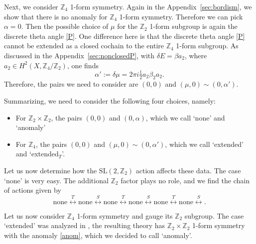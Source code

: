 \documentclass[12pt]{article}
\numberwithin{equation}{section}
\def\bZ{\mathbb{Z}}
\def\SL{\mathrm{SL}}
\begin{document}
Next, we consider $\bZ_4$ 1-form symmetry.
Again in the Appendix~\ref{sec:bordism}, we show that there is no anomaly for $\bZ_4$ 1-form symmetry.
Therefore we can pick $\alpha=0$. Then the possible choice of $\mu$ for the $\bZ_2$ 1-form subgroup is again the discrete theta angle \eqref{P}.
One difference here is that the discrete theta angle \eqref{P} cannot be extended as a closed cochain to the entire $\bZ_4$ 1-form subgroup.
As discussed in the Appendix~\ref{sec:nonclosedP}, with $\delta E=\beta a_2$,
where $a_2\in H^2(X,\bZ_4/\bZ_2)$,
one finds \begin{equation}
\alpha':=\delta \mu = 2\pi i \tfrac12 a_2 \beta_2 a_2.\label{anom'}
\end{equation}
Therefore, the pairs we need to consider are $(0,0)$ and $(\mu,0)\sim (0,\alpha')$. 

\def\Textended{extended$_T$}
Summarizing,  we need to consider the following four choices, namely:
\begin{itemize}
\item For $\bZ_2\times \bZ_2$, the pairs $(0,0)$ and $(0,\alpha)$, which we call `none' and `anomaly'
\item For $\bZ_4$, the pairs $(0,0)$ and $(\mu,0)\sim (0,\alpha')$, which we call `extended' and `\Textended'.
\end{itemize}


Let us now determine how the $\SL(2,\bZ_2)$ action affects these data.
The case `none' is very easy.
The additional $\bZ_2$ factor plays no role, and we find the chain of actions given by \begin{equation}
\text{none} \stackrel{T}{\longleftrightarrow} 
\text{none} \stackrel{S}{\longleftrightarrow} 
\text{none} \stackrel{T}{\longleftrightarrow} 
\text{none} \stackrel{S}{\longleftrightarrow} 
\text{none} \stackrel{T}{\longleftrightarrow} 
\text{none} \stackrel{S}{\longleftrightarrow} 
\label{trivial-chain}.
\end{equation} 

Let us now consider $\bZ_4$ 1-form symmetry and gauge its $\bZ_2$ subgroup.
The case  `extended' was analyzed in \cite{Tachikawa:2017gyf},
the resulting theory has $\bZ_2\times \bZ_2$ 1-form symmetry with the anomaly \eqref{anom}, 
which we decided to call `anomaly'.
\end{document}
